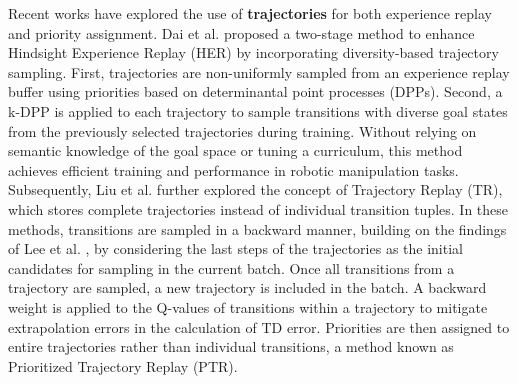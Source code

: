 
Recent works have explored the use of \textbf{trajectories} for both experience replay and priority assignment. Dai et al. \cite{dai2021diversity} proposed a two-stage method to enhance Hindsight Experience Replay (HER) by incorporating diversity-based trajectory sampling. First, trajectories are non-uniformly sampled from an experience replay buffer using priorities based on determinantal point processes (DPPs). Second, a k-DPP is applied to each trajectory to sample transitions with diverse goal states from the previously selected trajectories during training. Without relying on semantic knowledge of the goal space or tuning a curriculum, this method achieves efficient training and performance in robotic manipulation tasks. Subsequently, Liu et al. \cite{liu2023prioritized} further explored the concept of Trajectory Replay (TR), which stores complete trajectories instead of individual transition tuples. In these methods, transitions are sampled in a backward manner, building on the findings of Lee et al. \cite{lee2019sample}, by considering the last steps of the trajectories as the initial candidates for sampling in the current batch. Once all transitions from a trajectory are sampled, a new trajectory is included in the batch. A backward weight is applied to the Q-values of transitions within a trajectory to mitigate extrapolation errors in the calculation of TD error. Priorities are then assigned to entire trajectories rather than individual transitions, a method known as Prioritized Trajectory Replay (PTR). 




